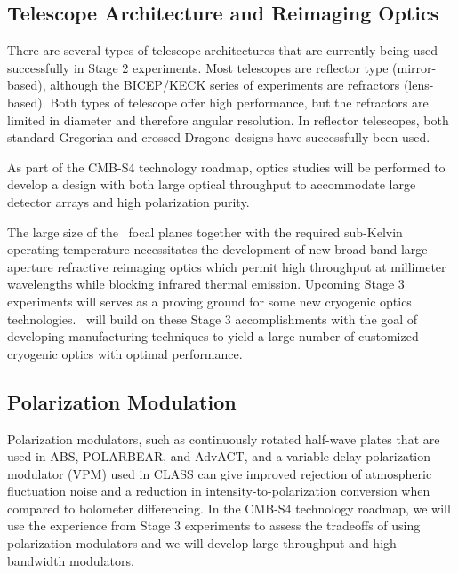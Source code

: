 \subsection{Telescope Architecture and Reimaging Optics }

There are several types of telescope architectures that are currently
being used successfully in Stage 2 experiments.   Most telescopes
are reflector type (mirror-based), although the BICEP/KECK series of experiments are
refractors (lens-based).   Both types of telescope offer high performance, but 
the refractors are limited in diameter and therefore angular resolution.  
In reflector telescopes, both standard Gregorian and crossed Dragone 
designs have successfully been used.   

As part of the CMB-S4 technology roadmap, optics studies will be performed
to develop a design with both large optical throughput to accommodate large
detector arrays and high polarization purity.

The large size of the
  \cmbexp\ focal planes together with the required sub-Kelvin
  operating temperature necessitates the development of new broad-band
  large aperture  refractive reimaging optics which permit high throughput at
  millimeter wavelengths while blocking infrared thermal
  emission. Upcoming Stage 3 experiments will serves as a proving
  ground for some new cryogenic optics technologies. \cmbexp\ will
  build on these Stage 3 accomplishments with the goal of developing
  manufacturing techniques to yield a large number of customized
  cryogenic optics with optimal performance.

\subsection{Polarization Modulation}

Polarization modulators, such as continuously rotated half-wave plates that are used in 
ABS, POLARBEAR, and AdvACT, and a variable-delay polarization modulator (VPM) used
in CLASS can give improved rejection of atmospheric fluctuation noise and a reduction 
in intensity-to-polarization conversion when compared to bolometer differencing.    In the
CMB-S4 technology roadmap, we will use the experience from Stage 3 experiments to assess
the tradeoffs of using polarization modulators and we will develop large-throughput and 
high-bandwidth modulators.  




     
     
%



